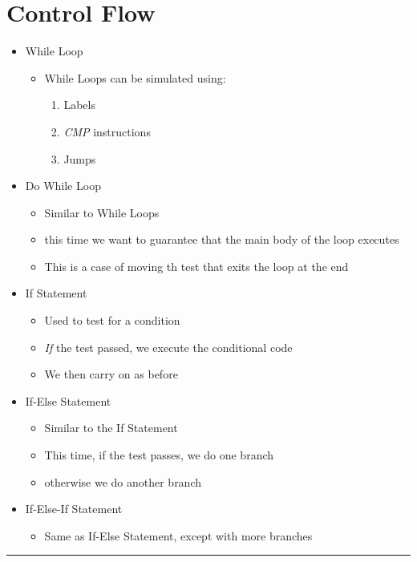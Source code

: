 \documentclass{article}
\begin{document}
\section{Control Flow}
\begin{itemize}
  \item{While Loop}
  \begin{itemize}
    \item{While Loops can be simulated using:}
    \begin{enumerate}
      \item{Labels}
      \item{\textit{CMP} instructions}
      \item{Jumps}
    \end{enumerate}
  \end{itemize}
  \item{Do While Loop}
  \begin{itemize}
    \item{Similar to While Loops}
    \item{this time we want to guarantee that the main body of the loop executes}
    \item{This is a case of moving th test that exits the loop at the end}
  \end{itemize}
  \item{If Statement}
  \begin{itemize}
    \item{Used to test for a condition}
    \item{\textit{If} the test passed, we execute the conditional code}
    \item{We then carry on as before}
  \end{itemize}
  \item{If-Else Statement}
  \begin{itemize}
    \item{Similar to the If Statement}
    \item{This time, if the test passes, we do one branch}
    \item{otherwise we do another branch}
  \end{itemize}
  \item{If-Else-If Statement}
  \begin{itemize}
    \item{Same as If-Else Statement, except with more branches}
  \end{itemize}
\end{itemize}

\begin{center}
  \rule{.5\textwidth}{0.4pt}
\end{center}
\end{document}
